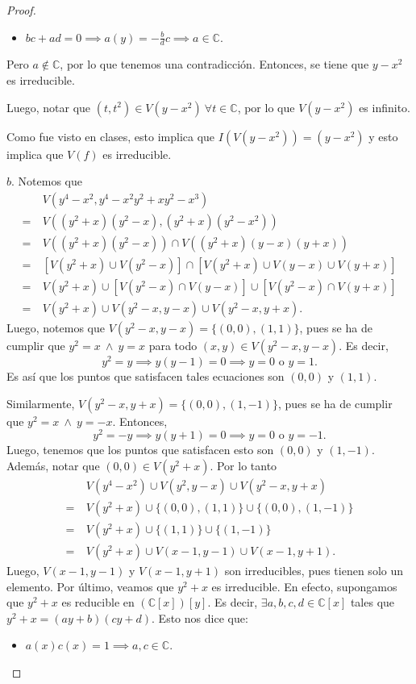 \documentclass{amsart}
\theoremstyle{plain}
\newcommand{\C}{\mathbb{C}}
\begin{document}
\begin{proof}
\begin{itemize}
			\item $bc + ad = 0 \implies a(y) = -\frac{b}{d}c \implies a \in \C$.
		\end{itemize}
		Pero $a \not\in \C$, por lo que tenemos una contradicción. Entonces, se tiene que $y - x^{2}$ es irreducible. \par
		Luego, notar que $(t,t^{2}) \in V(y - x^{2})\ \forall t \in \C$, por lo que $V(y - x^{2})$ es infinito. \par
		Como fue visto en clases, esto implica que $I(V(y - x^{2})) = (y - x^{2})$ y esto implica que $V(f)$ es irreducible. \par
		$\boxed{b.}$ Notemos que
		\begin{align*}
			& V(y^{4} - x^{2}, y^{4} - x^{2}y^{2} + xy^{2} - x^{3}) \\
			= \ & V((y^{2} + x)(y^{2} - x), (y^{2} + x)(y^{2} - x^{2})) \\
			= \ & V((y^{2} + x)(y^{2} - x)) \cap V((y^{2} + x)(y - x)(y + x)) \\
			= \ & [V(y^{2} + x) \cup V(y^{2} - x)] \cap [V(y^{2} + x) \cup V(y - x) \cup V(y + x)] \\
			= \ & V(y^{2} + x) \cup [V(y^{2} - x) \cap V(y - x)] \cup [V(y^{2} - x) \cap V(y + x)] \\
			= \ & V(y^{2} + x) \cup V(y^{2} - x, y - x) \cup V(y^{2} - x, y + x)
		.\end{align*}
		Luego, notemos que $V(y^{2} - x, y - x) = \{(0,0), (1,1)\}$, pues se ha de cumplir que $y^{2} = x \ \wedge \ y = x$ para todo $(x,y) \in V(y^{2} - x, y - x)$. Es decir,
		\[ y^{2} = y \implies y(y - 1) = 0 \implies y = 0 \text{ o } y = 1. \]
		Es así que los puntos que satisfacen tales ecuaciones son $(0,0)$ y $(1,1)$. \par
		Similarmente, $V(y^{2} - x, y + x) = \{(0,0), (1,-1)\}$, pues se ha de cumplir que $y^{2} = x \ \wedge \ y = -x$. Entonces,
		\[ y^{2} = -y \implies y(y + 1) = 0 \implies y = 0 \text{ o } y = -1. \]
		Luego, tenemos que los puntos que satisfacen esto son $(0,0)$ y $(1, -1)$. Además, notar que $(0,0) \in V(y^{2} + x)$. Por lo tanto
		\begin{align*}
			& V(y^{4} - x^{2}) \cup V(y^{2}, y - x) \cup V(y^{2} - x, y + x) \\
			= \ & V(y^{2} + x) \cup \{(0,0), (1,1)\} \cup \{(0,0), (1,-1)\} \\
			= \ & V(y^{2} + x) \cup \{(1,1)\} \cup \{(1,-1)\} \\
			= \ & V(y^{2} + x) \cup V(x - 1, y - 1) \cup V(x - 1, y + 1)
		.\end{align*}
		Luego, $V(x - 1, y - 1)$ y $V(x - 1, y + 1)$ son irreducibles, pues tienen solo un elemento. Por último, veamos que $y^{2} + x$ es irreducible. En efecto, supongamos que $y^{2} + x$ es reducible en $(\C[x])[y]$. Es decir, $\exists a,b,c,d \in \C[x]$ tales que $y^{2} + x = (ay + b)(cy + d)$. Esto nos dice que:
		\begin{itemize}
			\item $a(x) c(x) = 1 \implies a,c \in \C$.


\end{itemize}
\end{proof}
\end{document}

